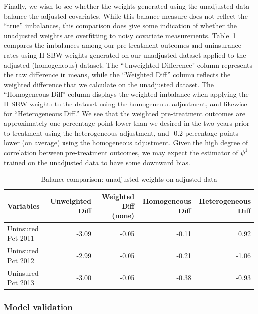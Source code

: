 Finally, we wish to see whether the weights generated using the unadjusted data balance the adjusted covariates. While this balance measure does not reflect the ``true'' imbalances, this comparison does give some indication of whether the unadjusted weights are overfitting to noisy covariate measurements. Table~\ref{tab:balcomp} compares the imbalances among our pre-treatment outcomes and uninsurance rates using H-SBW weights generated on our unadjusted dataset applied to the adjusted (homogeneous) dataset. The ``Unweighted Difference'' column represents the raw difference in means, while the ``Weighted Diff'' column reflects the weighted difference that we calculate on the unadjusted dataset. The ``Homogeneous Diff'' column displays the weighted imbalance when applying the H-SBW weights to the dataset using the homogeneous adjustment, and likewise for ``Heterogeneous Diff.'' We see that the weighted pre-treatment outcomes are approximately one percentage point lower than we desired in the two years prior to treatment using the heterogeneous adjustment, and -0.2 percentage points lower (on average) using the homogeneous adjustment. Given the high degree of correlation between pre-treatment outcomes, we may expect the estimator of $\psi^1$ trained on the unadjusted data to have some downward bias.

\begin{table}[ht]
\caption{Balance comparison: unadjusted weights on adjusted data}
\label{tab:balcomp}
\begin{tabular}{lrrrr}
  \hline
Variables & Unweighted Diff & Weighted Diff (none) & Homogeneous Diff & Heterogeneous Diff\\ 
  \hline
Uninsured Pct 2011 & -3.09 & -0.05 & -0.11 & 0.92 \\ 
  Uninsured Pct 2012 & -2.99 & -0.05 & -0.21 & -1.06 \\ 
  Uninsured Pct 2013 & -3.00 & -0.05 & -0.38 & -0.93 
   \hline
\end{tabular}
\end{table}

\subsubsection{Model validation}

